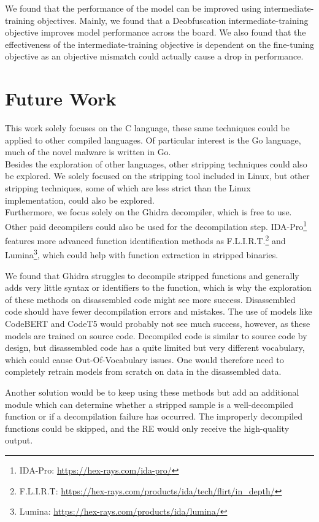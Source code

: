 We found that the performance of the model can be improved using intermediate-training objectives. Mainly, we found that a Deobfuscation intermediate-training objective improves model performance across the board. We also found that the effectiveness of the intermediate-training objective is dependent on the fine-tuning objective as an objective mismatch could actually cause a drop in performance.

\section{Future Work}
This work solely focuses on the C language, these same techniques could be applied to other compiled languages. Of particular interest is the Go language, much of the novel malware is written in Go.\\
Besides the exploration of other languages, other stripping techniques could also be explored. We solely focused on the stripping tool included in Linux, but other stripping techniques, some of which are less strict than the Linux implementation, could also be explored.\\

Furthermore, we focus solely on the Ghidra decompiler, which is free to use. Other paid decompilers could also be used for the decompilation step. IDA-Pro\footnote{IDA-Pro: \url{https://hex-rays.com/ida-pro/}} features more advanced function identification methods as F.L.I.R.T.\footnote{F.L.I.R.T: \url{https://hex-rays.com/products/ida/tech/flirt/in_depth/}} and Lumina\footnote{Lumina: \url{https://hex-rays.com/products/ida/lumina/}}, which could help with function extraction in stripped binaries.

We found that Ghidra struggles to decompile stripped functions and generally adds very little syntax or identifiers to the function, which is why the exploration of these methods on disassembled code might see more success. Disassembled code should have fewer decompilation errors and mistakes. The use of models like CodeBERT and CodeT5 would probably not see much success, however, as these models are trained on source code. Decompiled code is similar to source code by design, but disassembled code has a quite limited but very different vocabulary, which could cause Out-Of-Vocabulary issues. One would therefore need to completely retrain models from scratch on data in the disassembled data.

Another solution would be to keep using these methods but add an additional module which can determine whether a stripped sample is a well-decompiled function or if a decompilation failure has occurred. The improperly decompiled functions could be skipped, and the RE would only receive the high-quality output.

